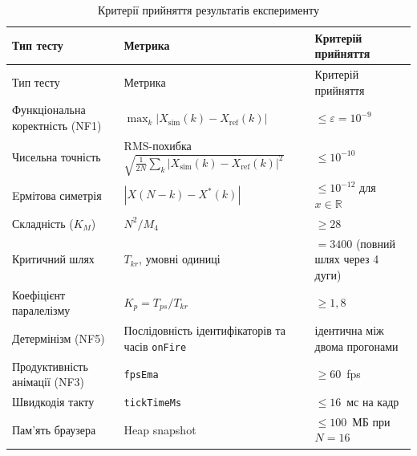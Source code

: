 \documentclass[
]{article}
\begin{document}
\begin{longtable}[]{@{}
  >{\raggedright\arraybackslash}p{}
  >{\raggedright\arraybackslash}p{}
  >{\raggedright\arraybackslash}p{}@{}}
\caption{Критерії прийняття результатів експерименту}\tabularnewline
\toprule\noalign{}
\begin{minipage}[b]{\linewidth}\raggedright
Тип тесту
\end{minipage} & \begin{minipage}[b]{\linewidth}\raggedright
Метрика
\end{minipage} & \begin{minipage}[b]{\linewidth}\raggedright
Критерій прийняття
\end{minipage} \\
\midrule\noalign{}
\endfirsthead
\toprule\noalign{}
\begin{minipage}[b]{\linewidth}\raggedright
Тип тесту
\end{minipage} & \begin{minipage}[b]{\linewidth}\raggedright
Метрика
\end{minipage} & \begin{minipage}[b]{\linewidth}\raggedright
Критерій прийняття
\end{minipage} \\
\midrule\noalign{}
\endhead
\bottomrule\noalign{}
\endlastfoot
Функціональна коректність (NF1) &
\(\max_{k}|X_{\text{sim}}(k) - X_{\text{ref}}(k)|\) &
\(\leq \varepsilon = 10^{- 9}\) \\
Чисельна точність & RMS-похибка \(\sqrt{\frac{1}{2N}\sum_{k}|X_{\text{sim}}(k) - X_{\text{ref}}(k)|^{2}}\) & \(\leq 10^{- 10}\) \\
Eрмітова симетрія & \(|X(N - k) - X^{*}(k)|\) & \(\leq 10^{- 12}\) для
\(x \in \mathbb{R}\) \\
Складність (\(K_{M}\)) & \(N^{2}/M_{4}\) & \(\geq 28\) \\
Критичний шлях & \(T_{kr}\), умовні одиниці & \(= 3400\) (повний шлях через 4 дуги) \\
Коефіцієнт паралелізму & \(K_{p} = T_{ps}/T_{kr}\) & \(\geq 1,8\) \\
Детермінізм (NF5) & Послідовність ідентифікаторів та часів \texttt{onFire} & ідентична між двома прогонами \\
Продуктивність анімації (NF3) & \texttt{fpsEma} & \(\geq 60\)~fps \\
Швидкодія такту & \texttt{tickTimeMs} & \(\leq 16\)~мс на кадр \\
Пам'ять браузера & Heap snapshot & \(\leq 100\)~МБ при \(N = 16\) \\
\end{longtable}
\end{document}
